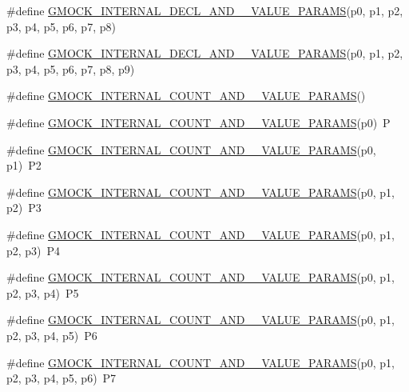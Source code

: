 \begin{DoxyCompactItemize}
\item 
\#define \hyperlink{gmock-generated-actions_8h_a94ebf056f6c78d158bf16eec04583dd0}{G\+M\+O\+C\+K\+\_\+\+I\+N\+T\+E\+R\+N\+A\+L\+\_\+\+D\+E\+C\+L\+\_\+\+A\+N\+D\+\_\+\_\+\+V\+A\+L\+U\+E\+\_\+\+P\+A\+R\+A\+MS}(p0,  p1,  p2,  p3,  p4,  p5,  p6,  p7,  p8)
\item 
\#define \hyperlink{gmock-generated-actions_8h_a125c9b0d293f0e900ff37ce42b8ed217}{G\+M\+O\+C\+K\+\_\+\+I\+N\+T\+E\+R\+N\+A\+L\+\_\+\+D\+E\+C\+L\+\_\+\+A\+N\+D\+\_\+\_\+\+V\+A\+L\+U\+E\+\_\+\+P\+A\+R\+A\+MS}(p0,  p1,  p2,  p3,  p4,  p5,  p6,  p7,  p8,  p9)
\item 
\#define \hyperlink{gmock-generated-actions_8h_a4876365f0389f3cd8021f650d095be55}{G\+M\+O\+C\+K\+\_\+\+I\+N\+T\+E\+R\+N\+A\+L\+\_\+\+C\+O\+U\+N\+T\+\_\+\+A\+N\+D\+\_\+\_\+\+V\+A\+L\+U\+E\+\_\+\+P\+A\+R\+A\+MS}()
\item 
\#define \hyperlink{gmock-generated-actions_8h_a372a4dbbfeba17c2af89aa1027cb7f67}{G\+M\+O\+C\+K\+\_\+\+I\+N\+T\+E\+R\+N\+A\+L\+\_\+\+C\+O\+U\+N\+T\+\_\+\+A\+N\+D\+\_\+\_\+\+V\+A\+L\+U\+E\+\_\+\+P\+A\+R\+A\+MS}(p0)~P
\item 
\#define \hyperlink{gmock-generated-actions_8h_a58ef57d40fec061e17fdcbf020b77e20}{G\+M\+O\+C\+K\+\_\+\+I\+N\+T\+E\+R\+N\+A\+L\+\_\+\+C\+O\+U\+N\+T\+\_\+\+A\+N\+D\+\_\+\_\+\+V\+A\+L\+U\+E\+\_\+\+P\+A\+R\+A\+MS}(p0,  p1)~P2
\item 
\#define \hyperlink{gmock-generated-actions_8h_a43c845e4e60b3e17c4e312bbc5a8bb66}{G\+M\+O\+C\+K\+\_\+\+I\+N\+T\+E\+R\+N\+A\+L\+\_\+\+C\+O\+U\+N\+T\+\_\+\+A\+N\+D\+\_\+\_\+\+V\+A\+L\+U\+E\+\_\+\+P\+A\+R\+A\+MS}(p0,  p1,  p2)~P3
\item 
\#define \hyperlink{gmock-generated-actions_8h_aeb588496af9fc2b8e3c4702dac7e966e}{G\+M\+O\+C\+K\+\_\+\+I\+N\+T\+E\+R\+N\+A\+L\+\_\+\+C\+O\+U\+N\+T\+\_\+\+A\+N\+D\+\_\+\_\+\+V\+A\+L\+U\+E\+\_\+\+P\+A\+R\+A\+MS}(p0,  p1,  p2,  p3)~P4
\item 
\#define \hyperlink{gmock-generated-actions_8h_a29d90b8cedec75d4acbf2df27ef0e3b5}{G\+M\+O\+C\+K\+\_\+\+I\+N\+T\+E\+R\+N\+A\+L\+\_\+\+C\+O\+U\+N\+T\+\_\+\+A\+N\+D\+\_\+\_\+\+V\+A\+L\+U\+E\+\_\+\+P\+A\+R\+A\+MS}(p0,  p1,  p2,  p3,  p4)~P5
\item 
\#define \hyperlink{gmock-generated-actions_8h_ab79feaedfcef7df29e87695b82e9b65d}{G\+M\+O\+C\+K\+\_\+\+I\+N\+T\+E\+R\+N\+A\+L\+\_\+\+C\+O\+U\+N\+T\+\_\+\+A\+N\+D\+\_\+\_\+\+V\+A\+L\+U\+E\+\_\+\+P\+A\+R\+A\+MS}(p0,  p1,  p2,  p3,  p4,  p5)~P6
\item 
\#define \hyperlink{gmock-generated-actions_8h_ab4b49f0cdb482c0d7a6249607ac44f24}{G\+M\+O\+C\+K\+\_\+\+I\+N\+T\+E\+R\+N\+A\+L\+\_\+\+C\+O\+U\+N\+T\+\_\+\+A\+N\+D\+\_\+\_\+\+V\+A\+L\+U\+E\+\_\+\+P\+A\+R\+A\+MS}(p0,  p1,  p2,  p3,  p4,  p5,  p6)~P7

\end{DoxyCompactItemize}
